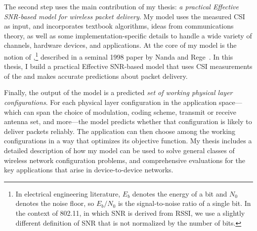 The second step uses the main contribution of my thesis: \emph{a practical Effective SNR-based model for wireless packet delivery}. My model uses the measured CSI as input, and incorporates textbook algorithms, ideas from communications theory, as well as some implementation-specific details to handle a wide variety of channels, hardware devices, and applications. At the core of my model is the notion of ,\footnote{In electrical engineering literature, $E_b$ denotes the energy of a bit and $N_0$ denotes the noise floor, so $E_b/N_0$ is the signal-to-noise ratio of a single bit. In the context of 802.11, in which SNR is derived from RSSI, we use a slightly different definition of SNR that is not normalized by the number of bits.} described in a seminal 1998 paper by Nanda and Rege~\cite{Nanda_EffectiveSNR}. In this thesis, I build a practical Effective SNR-based model that uses CSI measurements of the and makes accurate predictions about packet delivery.

Finally, the output of the model is a predicted \emph{set of working physical layer configurations}. For each physical layer configuration in the application space---which can span the choice of modulation, coding scheme, transmit or receive antenna set, and more---the model predicts whether that configuration is likely to deliver packets reliably. The application can then choose among the working configurations in a way that optimizes its objective function. My thesis includes a detailed description of how my model can be used to solve general classes of wireless network configuration problems, and comprehensive evaluations for the key applications that arise in device-to-device networks.


